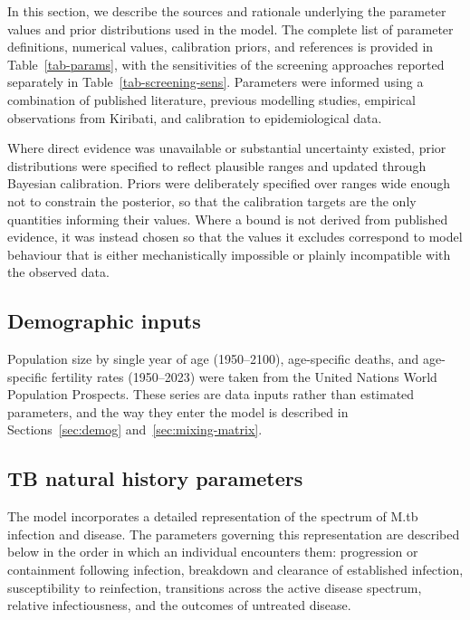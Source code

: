 In this section, we describe the sources and rationale underlying the parameter values and prior distributions used in the model. The complete list of parameter definitions, numerical values, calibration priors, and references is provided in Table~\ref{tab-params}, with the sensitivities of the screening approaches reported separately in Table~\ref{tab-screening-sens}. Parameters were informed using a combination of published literature, previous modelling studies, empirical observations from Kiribati, and calibration to epidemiological data. 

Where direct evidence was unavailable or substantial uncertainty existed, prior distributions were specified to reflect plausible ranges and updated through Bayesian calibration. Priors were deliberately specified over ranges wide enough not to constrain the posterior, so that the calibration targets are the only quantities informing their values. Where a bound is not derived from published evidence, it was instead chosen so that the values it excludes correspond to model behaviour that is either mechanistically impossible or plainly incompatible with the observed data.

\clearpage
\small
\setlength{\LTcapwidth}{\textwidth}



\subsection{Demographic inputs}
\label{sec:demog-inputs}

Population size by single year of age (1950--2100), age-specific deaths, and age-specific fertility rates (1950--2023) were taken from the United Nations World Population Prospects. These series are data inputs rather than estimated parameters, and the way they enter the model is described in Sections~\ref{sec:demog} and~\ref{sec:mixing-matrix}.

\subsection{TB natural history parameters}

The model incorporates a detailed representation of the spectrum of M.tb infection and disease. The parameters governing this representation are described below in the order in which an individual encounters them: progression or containment following infection, breakdown and clearance of established infection, susceptibility to reinfection, transitions across the active disease spectrum, relative infectiousness, and the outcomes of untreated disease.

